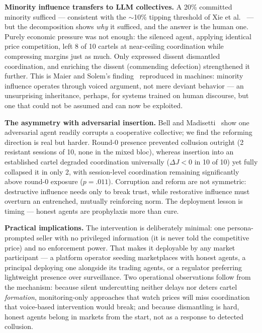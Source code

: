 \documentclass[acmsmall]{acmart}
\begin{document}
\textbf{Minority influence transfers to LLM collectives.}
A 20\% committed minority sufficed --- consistent with the
$\sim$10\% tipping threshold of Xie et al.~\cite{xie2011social} --- but
the decomposition shows \emph{why} it sufficed, and the answer is the
human one. Purely economic pressure was not enough: the silenced agent,
applying identical price competition, left 8 of 10 cartels at
near-ceiling coordination while compressing margins just as much. Only
expressed dissent dismantled coordination, and enriching the dissent
(commending defection) strengthened it further. This is Maier and
Solem's finding~\cite{maier1952contribution} reproduced in machines:
minority influence operates through voiced argument, not mere deviant
behavior --- an unsurprising inheritance, perhaps, for systems trained
on human discourse, but one that could not be assumed and can now be
exploited.

\textbf{The asymmetry with adversarial insertion.}
Bell and Madisetti~\cite{bell2026corruption} show one adversarial agent
readily corrupts a cooperative collective; we find the reforming
direction is real but harder. Round-0 presence prevented collusion
outright (2 resistant sessions of 10, none in the mixed bloc), whereas
insertion into an established cartel degraded coordination universally
($\Delta J<0$ in 10 of 10) yet fully collapsed it in only 2, with
session-level coordination remaining significantly above round-0
exposure ($p{=}.011$). Corruption and reform are not symmetric:
destructive influence needs only to break trust, while restorative
influence must overturn an entrenched, mutually reinforcing norm. The
deployment lesson is timing --- honest agents are prophylaxis more
than cure.

\textbf{Practical implications.}
The intervention is deliberately minimal: one persona-prompted seller
with no privileged information (it is never told the competitive price)
and no enforcement power. That makes it deployable by any market
participant --- a platform operator seeding marketplaces with honest
agents, a principal deploying one alongside its trading agents, or a
regulator preferring lightweight presence over surveillance. Two
operational observations follow from the mechanism: because silent
undercutting neither delays nor deters cartel \emph{formation},
monitoring-only approaches that watch prices will miss coordination
that voice-based intervention would break; and because dismantling is
hard, honest agents belong in markets from the start, not as a
response to detected collusion.
\end{document}
